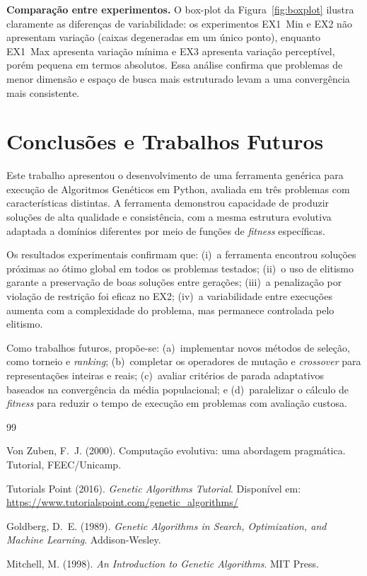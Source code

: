 \documentclass[12pt,twocolumn]{article}
\begin{document}
\textbf{Comparação entre experimentos.}
O box-plot da Figura~\ref{fig:boxplot} ilustra claramente as diferenças de variabilidade:
os experimentos EX1~Min e EX2 não apresentam variação (caixas degeneradas em um único
ponto), enquanto EX1~Max apresenta variação mínima e EX3 apresenta variação perceptível,
porém pequena em termos absolutos. Essa análise confirma que problemas de menor dimensão
e espaço de busca mais estruturado levam a uma convergência mais consistente.

\section{Conclusões e Trabalhos Futuros}

Este trabalho apresentou o desenvolvimento de uma ferramenta genérica para execução de
Algoritmos Genéticos em Python, avaliada em três problemas com características distintas.
A ferramenta demonstrou capacidade de produzir soluções de alta qualidade e consistência,
com a mesma estrutura evolutiva adaptada a domínios diferentes por meio de funções de
\textit{fitness} específicas.

Os resultados experimentais confirmam que:
(i)~a ferramenta encontrou soluções próximas ao ótimo global em todos os problemas
testados;
(ii)~o uso de elitismo garante a preservação de boas soluções entre gerações;
(iii)~a penalização por violação de restrição foi eficaz no EX2;
(iv)~a variabilidade entre execuções aumenta com a complexidade do problema, mas permanece
controlada pelo elitismo.

Como trabalhos futuros, propõe-se: (a)~implementar novos métodos de seleção, como
torneio e \textit{ranking}; (b)~completar os operadores de mutação e \textit{crossover}
para representações inteiras e reais; (c)~avaliar critérios de parada adaptativos baseados
na convergência da média populacional; e (d)~paralelizar o cálculo de \textit{fitness}
para reduzir o tempo de execução em problemas com avaliação custosa.


\begin{thebibliography}{99}

Von Zuben, F.~J. (2000).
\newblock Computação evolutiva: uma abordagem pragmática.
\newblock Tutorial, FEEC/Unicamp.

Tutorials Point (2016).
\newblock \textit{Genetic Algorithms Tutorial}.
\newblock Disponível em: \url{https://www.tutorialspoint.com/genetic_algorithms/}

Goldberg, D.~E. (1989).
\newblock \textit{Genetic Algorithms in Search, Optimization, and Machine Learning}.
\newblock Addison-Wesley.

Mitchell, M. (1998).
\newblock \textit{An Introduction to Genetic Algorithms}.
\newblock MIT Press.

\end{thebibliography}
\end{document}
